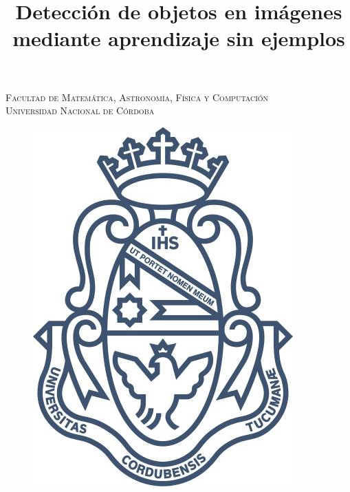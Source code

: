 \documentclass[12pt,twosided]{book}
\begin{document}
\newcommand{\etal}{\textit{et al}.}
\newcommand{\todos}[1]{{\color{red}[TODO: #1]}}
\renewcommand{\listtablename}{Índice de tablas}
\renewcommand{\tablename}{Tabla}

\title{Detección de objetos en imágenes mediante aprendizaje sin ejemplos} %

\begin{titlepage}
\begin{center}

\textsc{\Large Facultad de Matemática, Astronomía, Física y Computación}\\[1em]

\textsc{Universidad Nacional de Córdoba}

\begin{figure}[h]
\begin{center}
\includegraphics[scale=0.2]{img/unc.jpg}
\end{center}
\end{figure}


\end{center}
\end{titlepage}
\end{document}
